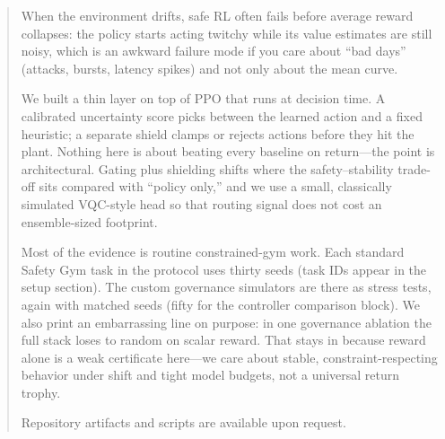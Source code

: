 \begin{abstract}
When the environment drifts, safe RL often fails before average reward collapses: the policy starts acting twitchy while its value estimates are still noisy, which is an awkward failure mode if you care about ``bad days'' (attacks, bursts, latency spikes) and not only about the mean curve.

We built a thin layer on top of PPO that runs at decision time. A calibrated uncertainty score picks between the learned action and a fixed heuristic; a separate shield clamps or rejects actions before they hit the plant. Nothing here is about beating every baseline on return---the point is architectural. Gating plus shielding shifts where the safety--stability trade-off sits compared with ``policy only,'' and we use a small, classically simulated VQC-style head so that routing signal does not cost an ensemble-sized footprint.

Most of the evidence is routine constrained-gym work. Each standard Safety Gym task in the protocol uses thirty seeds (task IDs appear in the setup section). The custom governance simulators are there as stress tests, again with matched seeds (fifty for the controller comparison block). We also print an embarrassing line on purpose: in one governance ablation the full stack loses to random on scalar reward. That stays in because reward alone is a weak certificate here---we care about stable, constraint-respecting behavior under shift and tight model budgets, not a universal return trophy.

Repository artifacts and scripts are available upon request.
\end{abstract}
